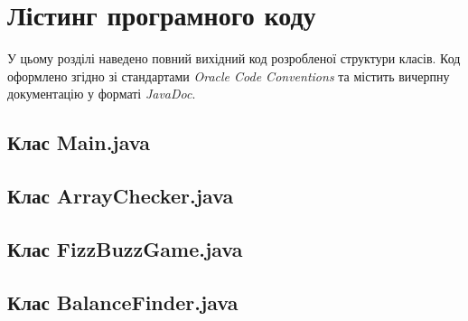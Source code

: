\section{Лістинг програмного коду}

У цьому розділі наведено повний вихідний код розробленої структури класів. 
Код оформлено згідно зі стандартами \textit{Oracle Code Conventions} та містить 
вичерпну документацію у форматі \textit{JavaDoc}.

\subsection{Клас Main.java}

\newpage %
\subsection{Клас ArrayChecker.java}

\newpage %
\subsection{Клас FizzBuzzGame.java}

\newpage %
\subsection{Клас BalanceFinder.java}



